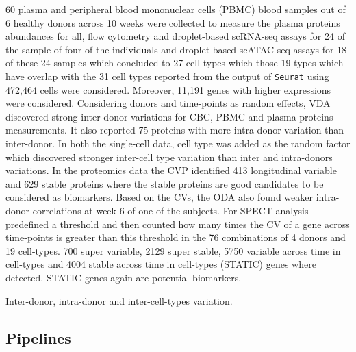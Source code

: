 \documentclass[]{article}
\begin{document}
		60 plasma and peripheral blood mononuclear cells (PBMC) blood samples out of 6 healthy donors across 10 weeks were collected to measure the plasma proteins abundances for all, flow cytometry and droplet-based scRNA-seq assays for 24 of the sample of four of the individuals and droplet-based scATAC-seq assays for 18 of these 24 samples which concluded to 27 cell types which those 19 types which have overlap with the 31 cell types reported from the output of \texttt{Seurat} using 472,464 cells were considered. Moreover, 11,191 genes with higher expressions were considered. Considering donors and time-points as random effects, VDA discovered strong inter-donor variations for CBC, PBMC and plasma proteins measurements. It also reported 75 proteins with more intra-donor variation than inter-donor. In both the single-cell data, cell type was added as the random factor which discovered stronger inter-cell type variation than inter and intra-donors variations. In the proteomics data the CVP identified 413 longitudinal variable and 629 stable proteins where the stable proteins are good candidates to be considered as biomarkers. Based on the CVs, the ODA also found weaker intra-donor correlations at week 6 of one of the subjects. For SPECT analysis \cite{Vasaikaretal2023} predefined a threshold and then counted how many times the CV of a gene across time-points is greater than this threshold in the 76 combinations of 4 donors and 19 cell-types. 700 super variable, 2129 super stable, 5750 variable across time in cell-types and 4004 stable across time in cell-types (STATIC) genes where detected. STATIC genes again are potential biomarkers. 
		
		
		
		Inter-donor, intra-donor and inter-cell-types variation.
		
		\subsection{Pipelines}
		
\end{document}
